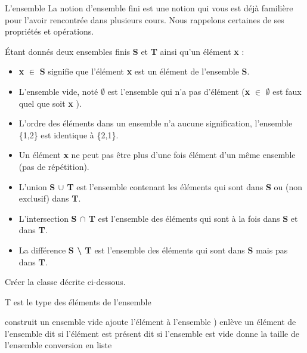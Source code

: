\begin{Exercice}{L'ensemble}
		La notion d’ensemble fini est une notion qui vous est déjà 
		familière pour l’avoir rencontrée dans plusieurs cours. Nous rappelons
		certaines de ses propriétés et opérations. 
				
		Étant donnés deux ensembles
		finis \textbf{S} et \textbf{T} ainsi qu’un élément \textbf{x} :

		\begin{itemize}
		\item 
			\textbf{x} {${\in}$} \textbf{S} signifie que l’élément \textbf{x}
			est un élément de l’ensemble \textbf{S}.
		\item 
			L’ensemble vide, noté \textbf{${\emptyset}$} 
			est l’ensemble qui n’a pas d’élément 
			(\textbf{x} {${\in}$} \textbf{${\emptyset}$} 
			est faux quel que soit \textbf{x} ).
		\item 
			L’ordre des éléments dans un ensemble n’a
			aucune signification, l’ensemble \{1,2\} est
			identique à \{2,1\}.
		\item 
			Un élément \textbf{x} ne peut
			pas être plus d’une fois élément d’un même ensemble 
			(pas de répétition).
		\item 
			L’union \textbf{S ${\cup}$ T} 
			est l’ensemble contenant les éléments qui sont dans 
			\textbf{S} ou (non exclusif) dans \textbf{T}.
		\item 
			L’intersection \textbf{S ${\cap}$ T} 
			est l’ensemble des éléments qui sont à la fois 
			dans \textbf{S} et dans \textbf{T}.
		\item 
			La différence \textbf{S {\textbackslash} T} 
			est l’ensemble des éléments qui sont 
			dans \textbf{S} mais pas dans \textbf{T}.
		\end{itemize}
		
		Créer la classe 
		décrite ci-dessous.
		
		\begin{LDA}
			\RComment T est le type des éléments de l'ensemble
			
				\Public
				\RComment construit un ensemble vide
				\RComment ajoute l'élément à l'ensemble
				)
				\RComment enlève un élément de l'ensemble
				\RComment dit si l'élément est présent
				\RComment dit si l'ensemble est vide
				\RComment donne la taille de l'ensemble
				\RComment conversion en liste
			\EndClass
		\end{LDA}
		

\end{Exercice}
